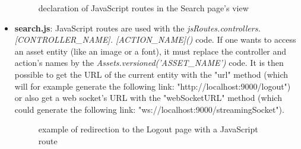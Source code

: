 \documentclass[a4paper,11pt]{report}
\begin{document}
\begin{itemize}
	\begin{figure}[H]
	\vspace{-5pt}
	\begin{center}
	\vspace{-5pt}
	\caption{declaration of JavaScript routes in the Search page's view}
	\end{center}
	\end{figure}
	\vspace{-20pt}
	\item \textbf{search.js}: JavaScript routes are used with the \emph{jsRoutes.controllers.[CONTROLLER\_NAME]. [ACTION\_NAME]()} code. If one wants to access an asset entity (like an image or a font), it must replace the controller and action's names by the \emph{Assets.versioned('ASSET\_NAME')} code. It is then possible to get the URL of the current entity with the "url" method (which will for example generate the following link: "http://localhost:9000/logout") or also get a web socket's URL with the "webSocketURL" method (which could generate the following link: "ws://localhost:9000/streamingSocket").
	\begin{figure}[H]
	\vspace{-5pt}
	\begin{center}
	\vspace{-5pt}
	\caption{example of redirection to the Logout page with a JavaScript route}
	\end{center}
	\end{figure}
\end{itemize}
\end{document}
